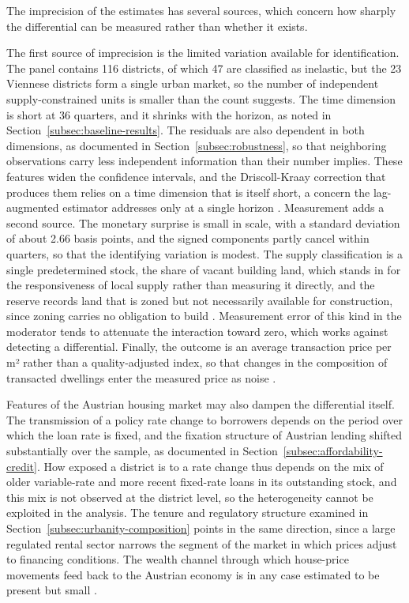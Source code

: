 \documentclass[a4paper,12pt, headsepline]{scrartcl}
\numberwithin{equation}{section}
\begin{document}
The imprecision of the estimates has several sources, which concern how sharply the differential can be measured rather than whether it exists.

The first source of imprecision is the limited variation available for identification. The panel contains 116 districts, of which 47 are classified as inelastic, but the 23 Viennese districts form a single urban market, so the number of independent supply-constrained units is smaller than the count suggests. The time dimension is short at 36 quarters, and it shrinks with the horizon, as noted in Section~\ref{subsec:baseline-results}. The residuals are also dependent in both dimensions, as documented in Section~\ref{subsec:robustness}, so that neighboring observations carry less independent information than their number implies. These features widen the confidence intervals, and the Driscoll-Kraay correction that produces them relies on a time dimension that is itself short, a concern the lag-augmented estimator addresses only at a single horizon \citep{driscoll1998, montielolea2021}. Measurement adds a second source. The monetary surprise is small in scale, with a standard deviation of about 2.66 basis points, and the signed components partly cancel within quarters, so that the identifying variation is modest. The supply classification is a single predetermined stock, the share of vacant building land, which stands in for the responsiveness of local supply rather than measuring it directly, and the reserve records land that is zoned but not necessarily available for construction, since zoning carries no obligation to build \citep{schindelegger2025}. Measurement error of this kind in the moderator tends to attenuate the interaction toward zero, which works against detecting a differential. Finally, the outcome is an average transaction price per m² rather than a quality-adjusted index, so that changes in the composition of transacted dwellings enter the measured price as noise \citep{mundt2017, spiegel2025}.

Features of the Austrian housing market may also dampen the differential itself. The transmission of a policy rate change to borrowers depends on the period over which the loan rate is fixed, and the fixation structure of Austrian lending shifted substantially over the sample, as documented in Section~\ref{subsec:affordability-credit}. How exposed a district is to a rate change thus depends on the mix of older variable-rate and more recent fixed-rate loans in its outstanding stock, and this mix is not observed at the district level, so the heterogeneity cannot be exploited in the analysis. The tenure and regulatory structure examined in Section~\ref{subsec:urbanity-composition} points in the same direction, since a large regulated rental sector narrows the segment of the market in which prices adjust to financing conditions. The wealth channel through which house-price movements feed back to the Austrian economy is in any case estimated to be present but small \citep{albacete2017}.
\end{document}
